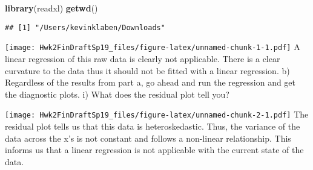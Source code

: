 \documentclass[12pt,]{article}
\newenvironment{Shaded}{\begin{snugshade}}{\end{snugshade}}
\newcommand{\KeywordTok}[1]{\textcolor[rgb]{0.13,0.29,0.53}{\textbf{#1}}}
\newcommand{\DataTypeTok}[1]{\textcolor[rgb]{0.13,0.29,0.53}{#1}}
\newcommand{\DecValTok}[1]{\textcolor[rgb]{0.00,0.00,0.81}{#1}}
\newcommand{\StringTok}[1]{\textcolor[rgb]{0.31,0.60,0.02}{#1}}
\newcommand{\OperatorTok}[1]{\textcolor[rgb]{0.81,0.36,0.00}{\textbf{#1}}}
\newcommand{\NormalTok}[1]{#1}
\begin{document}
\begin{Shaded}
\begin{Highlighting}[]
\KeywordTok{library}\NormalTok{(readxl)}
\KeywordTok{getwd}\NormalTok{()}
\end{Highlighting}
\end{Shaded}

\begin{verbatim}
## [1] "/Users/kevinklaben/Downloads"
\end{verbatim}

\begin{Shaded}
\end{Shaded}

\texttt{[image: Hwk2FinDraftSp19\_files/figure-latex/unnamed-chunk-1-1.pdf]}
A linear regression of this raw data is clearly not applicable. There is
a clear curvature to the data thus it should not be fitted with a linear
regression. b) Regardless of the results from part a, go ahead and run
the regression and get the diagnostic plots. i) What does the residual
plot tell you?

\begin{Shaded}
\end{Shaded}

\texttt{[image: Hwk2FinDraftSp19\_files/figure-latex/unnamed-chunk-2-1.pdf]}
The residual plot tells us that this data is heteroskedastic. Thus, the
variance of the data across the x's is not constant and follows a
non-linear relationship. This informs us that a linear regression is not
applicable with the current state of the data.
\end{document}
